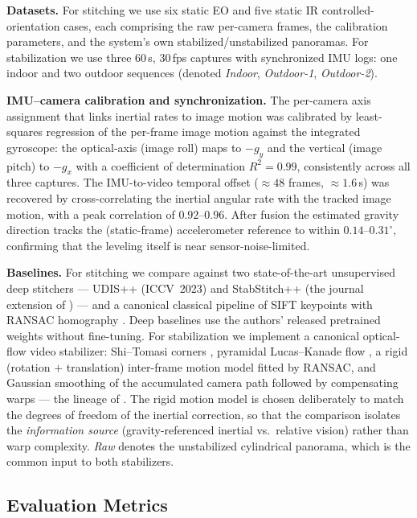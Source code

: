 \documentclass[journal]{IEEEtran}
\begin{document}
\textbf{Datasets.} For stitching we use six static EO and five static IR controlled-orientation cases, each comprising the raw per-camera frames, the calibration parameters, and the system's own stabilized/unstabilized panoramas. For stabilization we use three $60$\,s, $30$\,fps captures with synchronized IMU logs: one indoor and two outdoor sequences (denoted \emph{Indoor}, \emph{Outdoor-1}, \emph{Outdoor-2}).

\textbf{IMU--camera calibration and synchronization.} The per-camera axis assignment that links inertial rates to image motion was calibrated by least-squares regression of the per-frame image motion against the integrated gyroscope: the optical-axis (image roll) maps to $-g_y$ and the vertical (image pitch) to $-g_x$ with a coefficient of determination $R^2=0.99$, consistently across all three captures. The IMU-to-video temporal offset (${\approx}48$ frames, ${\approx}1.6$\,s) was recovered by cross-correlating the inertial angular rate with the tracked image motion, with a peak correlation of $0.92$--$0.96$. After fusion the estimated gravity direction tracks the (static-frame) accelerometer reference to within $0.14$--$0.31^\circ$, confirming that the leveling itself is near sensor-noise-limited.

\textbf{Baselines.} For stitching we compare against two state-of-the-art unsupervised deep stitchers --- UDIS++ \cite{nie2023parallax} (ICCV~2023) and StabStitch++ \cite{nie2025stabstitch2} (the journal extension of \cite{nie2024stabstitch}) --- and a canonical classical pipeline of SIFT keypoints \cite{lowe2004sift} with RANSAC homography \cite{fischler1981ransac,brown2007panorama}. Deep baselines use the authors' released pretrained weights without fine-tuning. For stabilization we implement a canonical optical-flow video stabilizer: Shi--Tomasi corners \cite{shi1994good}, pyramidal Lucas--Kanade flow \cite{lucas1981iterative}, a rigid (rotation $+$ translation) inter-frame motion model fitted by RANSAC, and Gaussian smoothing of the accumulated camera path followed by compensating warps --- the lineage of \cite{matsushita2006fullframe,grundmann2011l1,liu2013bundled}. The rigid motion model is chosen deliberately to match the degrees of freedom of the inertial correction, so that the comparison isolates the \emph{information source} (gravity-referenced inertial vs.\ relative vision) rather than warp complexity. \emph{Raw} denotes the unstabilized cylindrical panorama, which is the common input to both stabilizers.

\subsection{Evaluation Metrics}
\label{sec:metrics}
\end{document}
